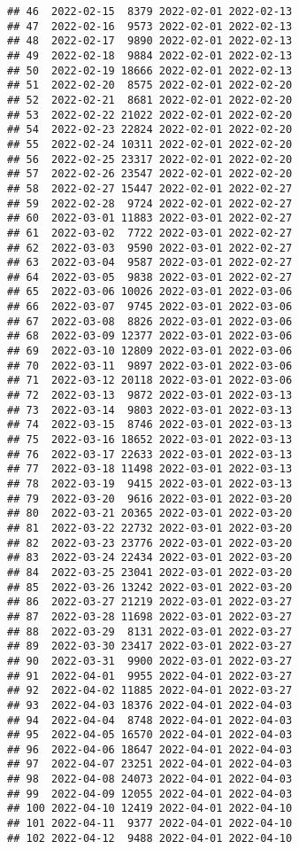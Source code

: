 \documentclass[
]{article}
\begin{document}
\begin{verbatim}
## 46  2022-02-15  8379 2022-02-01 2022-02-13
## 47  2022-02-16  9573 2022-02-01 2022-02-13
## 48  2022-02-17  9890 2022-02-01 2022-02-13
## 49  2022-02-18  9884 2022-02-01 2022-02-13
## 50  2022-02-19 18666 2022-02-01 2022-02-13
## 51  2022-02-20  8575 2022-02-01 2022-02-20
## 52  2022-02-21  8681 2022-02-01 2022-02-20
## 53  2022-02-22 21022 2022-02-01 2022-02-20
## 54  2022-02-23 22824 2022-02-01 2022-02-20
## 55  2022-02-24 10311 2022-02-01 2022-02-20
## 56  2022-02-25 23317 2022-02-01 2022-02-20
## 57  2022-02-26 23547 2022-02-01 2022-02-20
## 58  2022-02-27 15447 2022-02-01 2022-02-27
## 59  2022-02-28  9724 2022-02-01 2022-02-27
## 60  2022-03-01 11883 2022-03-01 2022-02-27
## 61  2022-03-02  7722 2022-03-01 2022-02-27
## 62  2022-03-03  9590 2022-03-01 2022-02-27
## 63  2022-03-04  9587 2022-03-01 2022-02-27
## 64  2022-03-05  9838 2022-03-01 2022-02-27
## 65  2022-03-06 10026 2022-03-01 2022-03-06
## 66  2022-03-07  9745 2022-03-01 2022-03-06
## 67  2022-03-08  8826 2022-03-01 2022-03-06
## 68  2022-03-09 12377 2022-03-01 2022-03-06
## 69  2022-03-10 12809 2022-03-01 2022-03-06
## 70  2022-03-11  9897 2022-03-01 2022-03-06
## 71  2022-03-12 20118 2022-03-01 2022-03-06
## 72  2022-03-13  9872 2022-03-01 2022-03-13
## 73  2022-03-14  9803 2022-03-01 2022-03-13
## 74  2022-03-15  8746 2022-03-01 2022-03-13
## 75  2022-03-16 18652 2022-03-01 2022-03-13
## 76  2022-03-17 22633 2022-03-01 2022-03-13
## 77  2022-03-18 11498 2022-03-01 2022-03-13
## 78  2022-03-19  9415 2022-03-01 2022-03-13
## 79  2022-03-20  9616 2022-03-01 2022-03-20
## 80  2022-03-21 20365 2022-03-01 2022-03-20
## 81  2022-03-22 22732 2022-03-01 2022-03-20
## 82  2022-03-23 23776 2022-03-01 2022-03-20
## 83  2022-03-24 22434 2022-03-01 2022-03-20
## 84  2022-03-25 23041 2022-03-01 2022-03-20
## 85  2022-03-26 13242 2022-03-01 2022-03-20
## 86  2022-03-27 21219 2022-03-01 2022-03-27
## 87  2022-03-28 11698 2022-03-01 2022-03-27
## 88  2022-03-29  8131 2022-03-01 2022-03-27
## 89  2022-03-30 23417 2022-03-01 2022-03-27
## 90  2022-03-31  9900 2022-03-01 2022-03-27
## 91  2022-04-01  9955 2022-04-01 2022-03-27
## 92  2022-04-02 11885 2022-04-01 2022-03-27
## 93  2022-04-03 18376 2022-04-01 2022-04-03
## 94  2022-04-04  8748 2022-04-01 2022-04-03
## 95  2022-04-05 16570 2022-04-01 2022-04-03
## 96  2022-04-06 18647 2022-04-01 2022-04-03
## 97  2022-04-07 23251 2022-04-01 2022-04-03
## 98  2022-04-08 24073 2022-04-01 2022-04-03
## 99  2022-04-09 12055 2022-04-01 2022-04-03
## 100 2022-04-10 12419 2022-04-01 2022-04-10
## 101 2022-04-11  9377 2022-04-01 2022-04-10
## 102 2022-04-12  9488 2022-04-01 2022-04-10

\end{verbatim}
\end{document}

